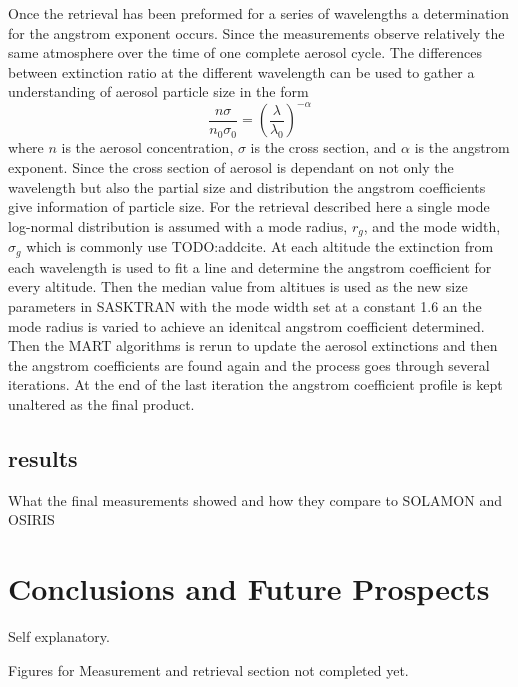 \documentclass[12pt]{article}
\begin{document}
Once the retrieval has been preformed for a series of wavelengths a determination for the angstrom exponent occurs. Since the measurements observe relatively the same atmosphere over the time of one complete aerosol cycle. The differences between extinction ratio at the different wavelength can be used to gather a understanding of aerosol particle size in the form
\begin{equation}
    \frac{n\sigma}{n_{0}\sigma_{0}} = \left(\frac{\lambda}{\lambda_{0}}\right)^{-\alpha}
    \label{eqn:agstromCoefficient}
\end{equation}
where $n$ is the aerosol concentration, $\sigma$ is the cross section, and $\alpha$ is the angstrom exponent. Since the cross section of aerosol is dependant on not only the wavelength but also the partial size and distribution the angstrom coefficients give information of particle size. For the retrieval described here a single mode log-normal distribution is assumed with a mode radius, $r_{g}$, and the mode width, $\sigma_{g}$ which is commonly use TODO:addcite. At each altitude the extinction from each wavelength is used to fit a line and determine the angstrom coefficient for every altitude. Then the median value from altitues is used as the new size parameters in SASKTRAN with the mode width set at a constant 1.6 an the mode radius is varied to achieve an idenitcal angstrom coefficient determined. Then the MART algorithms is rerun to update the aerosol extinctions and then the angstrom coefficients are found again and the process goes through several iterations. At the end of the last iteration the angstrom coefficient profile is kept unaltered as the final product. 

\subsection{results}

What the final measurements showed and how they compare to SOLAMON and OSIRIS

\section{Conclusions and Future Prospects}

Self explanatory.

Figures for Measurement and retrieval section not completed yet.

\newpage



\newpage
\end{document}
